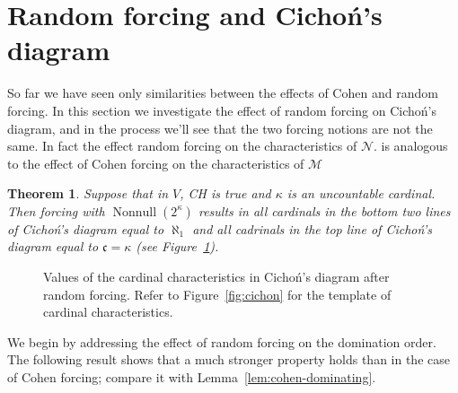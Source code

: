 \documentclass[11pt,oneside]{amsbook}
\newcommand{\Null}{\mathcal N}
\newcommand{\Meager}{\mathcal M}
\DeclareMathOperator{\Nonnull}{Nonnull}
\theoremstyle{definition}
\theoremstyle{plain}
\newtheorem{thm}{Theorem}[section]
\theoremstyle{definition}
\theoremstyle{remark}
\numberwithin{equation}{section}
\numberwithin{figure}{section}
\begin{document}


\section{Random forcing and Cicho\'n's diagram}

So far we have seen only similarities between the effects of Cohen and random forcing. In this section we investigate the effect of random forcing on Cicho\'n's diagram, and in the process we'll see that the two forcing notions are not the same. In fact the effect random forcing on the characteristics of $\Null$.  is analogous to the effect of Cohen forcing on the characteristics of $\Meager$

\begin{thm}
  \label{thm:random-cichon}
  Suppose that in $V$, CH is true and $\kappa$ is an uncountable cardinal. Then forcing with $\Nonnull(2^\kappa)$ results in all cardinals in the bottom two lines of Cicho\'n's diagram equal to $\aleph_1$ and all cadrinals in the top line of Cicho\'n's diagram equal to $\mathfrak c=\kappa$ (see Figure~\ref{fig:cichon-random}).
\end{thm}

\begin{figure}[h]
  \caption{Values of the cardinal characteristics in Cicho\'n's diagram after random forcing. Refer to Figure~\ref{fig:cichon} for the template of cardinal characteristics.\label{fig:cichon-random}}
\end{figure}

We begin by addressing the effect of random forcing on the domination order. The following result shows that a much stronger property holds than in the case of Cohen forcing; compare it with Lemma~\ref{lem:cohen-dominating}.
\end{document}
